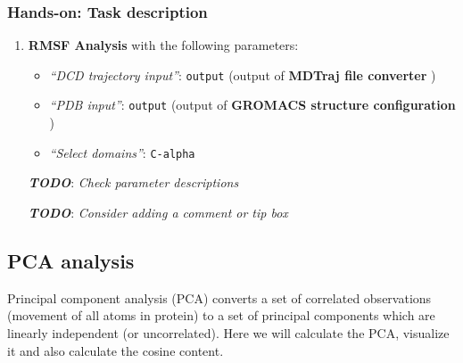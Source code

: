 \documentclass[twocolumn]{bmcart}%
\providecommand{\tightlist}{%
  \setlength{\itemsep}{0pt}\setlength{\parskip}{0pt}}
\providecommand{\tightlist}{%
  \setlength{\itemsep}{0pt}\setlength{\parskip}{0pt}}
\begin{document}
\begin{handson_box_colour}


\hypertarget{hands-on-task-description-12}{%
\subsubsection{Hands-on: Task
description}\label{hands-on-task-description-12}}

\begin{enumerate}
\def\labelenumi{\arabic{enumi}.}
\tightlist
\item
  \textbf{RMSF Analysis} with the following parameters:

  \begin{itemize}
  \tightlist
  \item
    \emph{``DCD trajectory input''}: \texttt{output} (output of
    \textbf{MDTraj file converter} )
  \item
    \emph{``PDB input''}: \texttt{output} (output of \textbf{GROMACS
    structure configuration} )
  \item
    \emph{``Select domains''}: \texttt{C-alpha}
  \end{itemize}

  \textbf{\emph{TODO}}: \emph{Check parameter descriptions}

  \textbf{\emph{TODO}}: \emph{Consider adding a comment or tip box}
\end{enumerate}


\end{handson_box_colour}


\hypertarget{pca-analysis}{%
\subsection*{PCA analysis}\label{pca-analysis}}

Principal component analysis (PCA) converts a set of correlated
observations (movement of all atoms in protein) to a set of principal
components which are linearly independent (or uncorrelated). Here we
will calculate the PCA, visualize it and also calculate the cosine
content.
\end{document}
